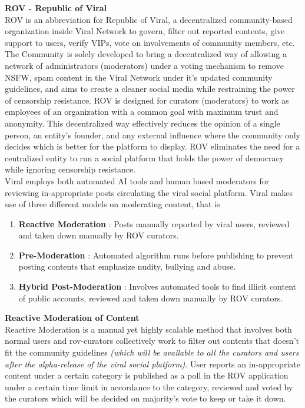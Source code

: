\documentclass[10pt]{article}
\begin{document}
\textbf{ROV - Republic of Viral}\\

ROV is an abbreviation for Republic of Viral, a decentralized community-based organization inside Viral Network to govern, filter out reported contents, give support to users, verify VIPs, vote on involvements of community members, etc. The Community is solely developed to bring a decentralized way of allowing a network of administrators (moderators) under a voting mechanism to remove NSFW, spam content in the Viral Network under it's updated community guidelines, and aims to create a cleaner social media while restraining the power of censorship resistance. ROV is designed for curators (moderators) to work as employees of an organization with a common goal with maximum trust and anonymity. This decentralized way effectively reduces the opinion of a single person, an entity’s founder, and any external influence where the community only decides which is better for the platform to display. ROV eliminates the need for a centralized entity to run a social platform that holds the power of democracy while ignoring censorship resistance. \\

Viral employs both automated AI tools and human based moderators for reviewing in-appropriate posts circulating the viral social platform. Viral makes use of three different models on moderating content, that is
\begin{enumerate}[leftmargin=+0.2in]
\item \textbf{Reactive Moderation} : Posts manually reported by viral users, reviewed and taken down manually by ROV curators.
\item \textbf{Pre-Moderation} : Automated algorithm runs before publishing to prevent posting contents that emphasize nudity, bullying and abuse.
\item \textbf{Hybrid Post-Moderation} : Involves automated tools to find illicit content of public accounts, reviewed and taken down manually by ROV curators.
\end{enumerate}

\textbf{Reactive Moderation of Content}\\

Reactive Moderation is a manual yet highly scalable method that involves both normal users and rov-curators collectively work to filter out contents that doesn't fit the community guidelines \textit{(which will be available to all the curators and users after the alpha-release of the viral social platform)}. User reports an in-appropriate content under a certain category is published as a poll in the ROV application under a certain time limit in accordance to the category, reviewed and voted by the curators which will be decided on majority's vote to keep or take it down.\\
\end{document}
